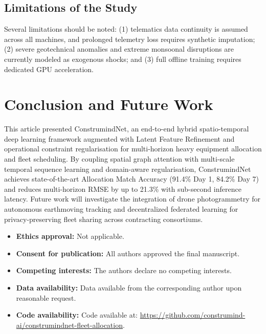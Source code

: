 \documentclass[pdflatex,sn-mathphys,Numbered]{sn-jnl}%
\begin{document}
\subsection{Limitations of the Study}
Several limitations should be noted: (1) telematics data continuity is assumed across all machines, and prolonged telemetry loss requires synthetic imputation; (2) severe geotechnical anomalies and extreme monsoonal disruptions are currently modeled as exogenous shocks; and (3) full offline training requires dedicated GPU acceleration.

\section{Conclusion and Future Work}\label{sec7}
This article presented ConstrumindNet, an end-to-end hybrid spatio-temporal deep learning framework augmented with Latent Feature Refinement and operational constraint regularisation for multi-horizon heavy equipment allocation and fleet scheduling. By coupling spatial graph attention with multi-scale temporal sequence learning and domain-aware regularisation, ConstrumindNet achieves state-of-the-art Allocation Match Accuracy (91.4\% Day 1, 84.2\% Day 7) and reduces multi-horizon RMSE by up to 21.3\% with sub-second inference latency. Future work will investigate the integration of drone photogrammetry for autonomous earthmoving tracking and decentralized federated learning for privacy-preserving fleet sharing across contracting consortiums.

\backmatter

\begin{itemize}
\item \textbf{Ethics approval:} Not applicable.
\item \textbf{Consent for publication:} All authors approved the final manuscript.
\item \textbf{Competing interests:} The authors declare no competing interests.
\item \textbf{Data availability:} Data available from the corresponding author upon reasonable request.
\item \textbf{Code availability:} Code available at: \url{https://github.com/construmind-ai/construmindnet-fleet-allocation}.
\end{itemize}
\end{document}
